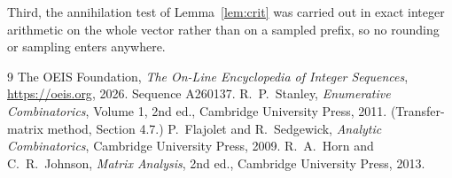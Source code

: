 \documentclass[11pt,a4paper]{article}
\theoremstyle{plain}
\theoremstyle{definition}
\begin{document}
Third, the annihilation test of Lemma~\ref{lem:crit} was carried out in exact integer
arithmetic on the whole vector rather than on a sampled prefix, so no rounding or sampling
enters anywhere.

\begin{thebibliography}{9}
 The OEIS Foundation, \emph{The On-Line Encyclopedia of Integer
Sequences}, \url{https://oeis.org}, 2026. Sequence A260137.
 R.~P.~Stanley, \emph{Enumerative Combinatorics}, Volume 1, 2nd ed.,
Cambridge University Press, 2011. (Transfer-matrix method, Section 4.7.)
 P.~Flajolet and R.~Sedgewick, \emph{Analytic Combinatorics}, Cambridge
University Press, 2009.
 R.~A.~Horn and C.~R.~Johnson, \emph{Matrix Analysis}, 2nd ed., Cambridge
University Press, 2013.
\end{thebibliography}
\end{document}
